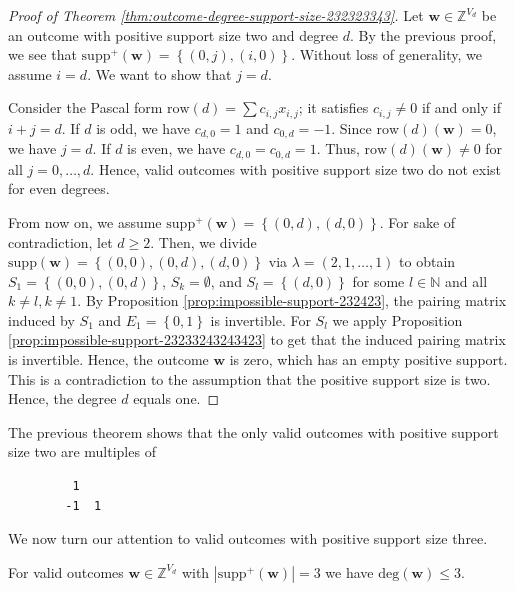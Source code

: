 \begin{proof}[Proof of Theorem \ref{thm:outcome-degree-support-size-232323343}]
    Let \( \mathbf{w} \in \mathbb{Z}^{V_d} \) be an outcome with positive support size two and degree \( d \).
    By the previous proof, we see that \( \mathrm{supp}^+({\mathbf{w}}) = \left\{  (0,j), (i,0) \right\} \). Without loss of generality, we assume \( i = d \). We want to show that \( j = d \). 
    
    Consider the Pascal form \( \mathrm{row}(d) = \sum c_{i,j} x_{i,j} \); it satisfies \( c_{i,j} \neq 0 \) if and only if \( i + j = d \). If \( d \) is odd, we have \( c_{d,0} = 1 \) and \( c_{0,d} = -1 \). Since \( \mathrm{row}(d)(\mathbf{w}) = 0 \), we have \( j = d \). If \( d \) is even, we have \( c_{d,0} = c_{0,d} = 1 \). Thus, \( \mathrm{row}(d)(\mathbf w) \neq 0 \) for all \( j = 0, \dots, d \). Hence, valid outcomes with positive support size two do not exist for even degrees.

    From now on, we assume \(         \mathrm{supp}^+({\mathbf{w}}) = \left\{  (0,d), (d,0) \right\}    \).
    For sake of contradiction, let \( d \geq 2 \). Then, we divide \( \mathrm{supp}({\mathbf{w}}) = \left\{  (0,0) , (0,d), (d,0) \right\} \)
    via \( \lambda = (2,1,\dots,1) \) to obtain \( S_1 = \left\{ (0,0), (0,d) \right\} \), \( S_k = \emptyset \), and \( S_l = \left\{ (d,0) \right\} \) for some \( l \in \mathbb{N} \) and all \( k \neq l, k \neq 1 \). By Proposition \ref{prop:impossible-support-232423}, the pairing matrix induced by \( S_1 \) and \( E_1 = \left\{ 0,1 \right\} \) is invertible. For \( S_l \) we apply Proposition \ref{prop:impossible-support-23233243243423} to get that the induced pairing matrix is invertible. Hence, the outcome \( \mathbf{w} \) is zero, which has an empty positive support. This is a contradiction to the assumption that the positive support size is two. Hence, the degree \( d \) equals one.
\end{proof}

\begin{example}
    The previous theorem shows that the only valid outcomes with positive support size two are multiples of
    \begin{verbatim}
         1
        -1  1
    \end{verbatim}
\end{example}

We now turn our attention to valid outcomes with positive support size three.

\begin{theorem}\label{thm:sfnjksnfjkwenjfk}
    For valid outcomes \( \mathbf w \in \mathbb{Z}^{V_d}  \) with \( |\mathrm{supp}^+(\mathbf w)| = 3 \) we have \( \mathrm{deg}(\mathbf w) \leq 3 \).
\end{theorem}

